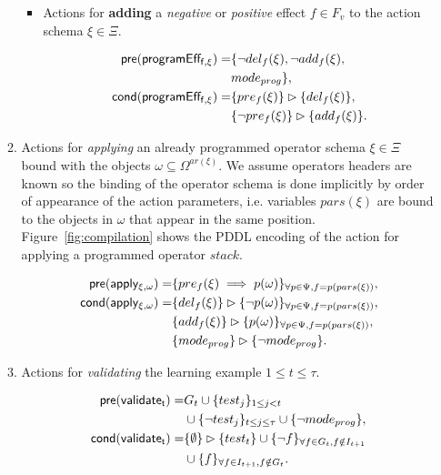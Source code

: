 \documentclass[letterpaper]{article} %
\newcommand{\pre}{\mathsf{pre}}     %
\newcommand{\cond}{\mathsf{cond}}   %
\begin{document}
\begin{itemize}
\begin{enumerate}
\begin{itemize}
\item Actions for {\bf adding} a {\em negative} or {\em positive} effect $f\in F_v$ to the action schema $\xi\in\Xi$.

\begin{small}
\begin{align*}
\hspace*{7pt}\pre(\mathsf{programEff_{f,\xi}})=&\{\neg del_{f}(\xi),\neg add_{f}(\xi),\\
& mode_{prog}\},\\
\cond(\mathsf{programEff_{f,\xi}})=&\{pre_{f}(\xi)\}\rhd\{del_{f}(\xi)\},\\
&\{\neg pre_{f}(\xi)\}\rhd\{add_{f}(\xi)\}.
\end{align*}
\end{small}
\end{itemize}

\item Actions for {\em applying} an already programmed operator schema $\xi\in\Xi$ bound with the objects $\omega\subseteq\Omega^{ar(\xi)}$. We assume operators headers are known so the binding of the operator schema is done implicitly by order of appearance of the action parameters, i.e. variables $pars(\xi)$ are bound to the objects in $\omega$ that appear in the same position. Figure~\ref{fig:compilation} shows the PDDL encoding of the action for applying a programmed operator $stack$.
\begin{small}
\begin{align*}
\hspace*{7pt}\pre(\mathsf{apply_{\xi,\omega}})=&\{pre_{f}(\xi)\implies p(\omega)\}_{\forall p\in\Psi,f=p(pars(\xi))},\\
\cond(\mathsf{apply_{\xi,\omega}})=&\{del_{f}(\xi)\}\rhd\{\neg p(\omega)\}_{\forall p\in\Psi,f=p(pars(\xi))},\\
&\{add_{f}(\xi)\}\rhd\{p(\omega)\}_{\forall p\in\Psi,f=p(pars(\xi))},\\
&\{mode_{prog}\}\rhd\{\neg mode_{prog}\}.
\end{align*}
\end{small}

\item Actions for {\em validating} the learning example {\tt\small $1\leq t\leq \tau$}.
\begin{small}
\begin{align*}
\hspace*{7pt}\pre(\mathsf{validate_{t}})=&G_t\cup\{test_j\}_{1\leq j<t}\\
&\cup\{\neg test_j\}_{t\leq j\leq \tau}\cup \{\neg mode_{prog}\},\\
\cond(\mathsf{validate_{t}})=&\{\emptyset\}\rhd\{test_t\} \cup \{\neg f\}_{\forall f\in G_t, f \notin I_{t+1}}\\
&\cup \{f\}_{\forall f\in I_{t+1}, f \notin G_t}.
\end{align*}
\end{small}
\end{enumerate}
\end{itemize}
\end{document}
